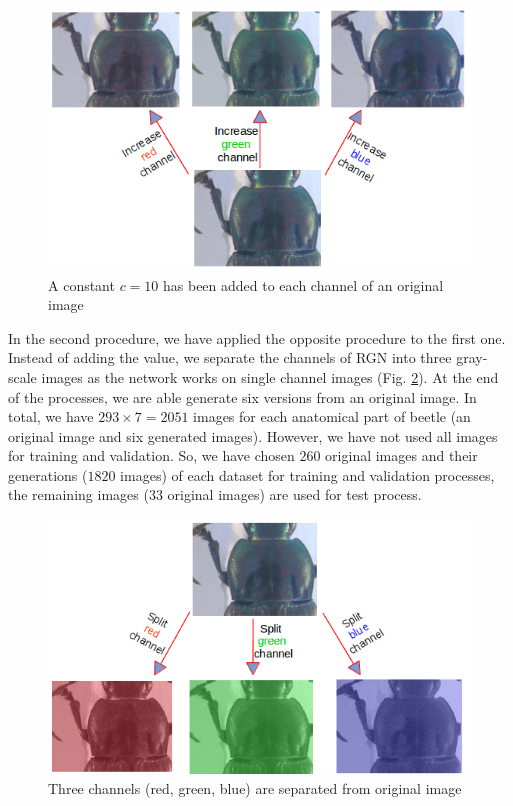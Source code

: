 \documentclass[review]{elsarticle}
\begin{document}
\begin{figure}[h]
	\centering
	\includegraphics[scale=0.35]{images/inc_channels}
	\caption{A constant $c = 10$ has been added to each channel of an original image}
	\label{figaug1}
\end{figure}

In the second procedure, we have applied the opposite procedure to the first one. Instead of adding the value, we separate the channels of RGN into three gray-scale images as the network works on single channel images (Fig. \ref{figaug2}). At the end of the processes, we are able generate six versions from an original image. In total, we have $293 \times 7 = 2051$ images for each anatomical part of beetle (an original image and six generated images). However, we have not used all images for training and validation. So, we have chosen $260$ original images and their generations ($1820$ images) of each dataset for training and validation processes, the remaining images ($33$ original images) are used for test process.

\begin{figure}[h]
	\centering
	\includegraphics[scale=0.35]{images/sp_channels}
	\caption{Three channels (red, green, blue) are separated from original image}
	\label{figaug2}
\end{figure}
\end{document}

